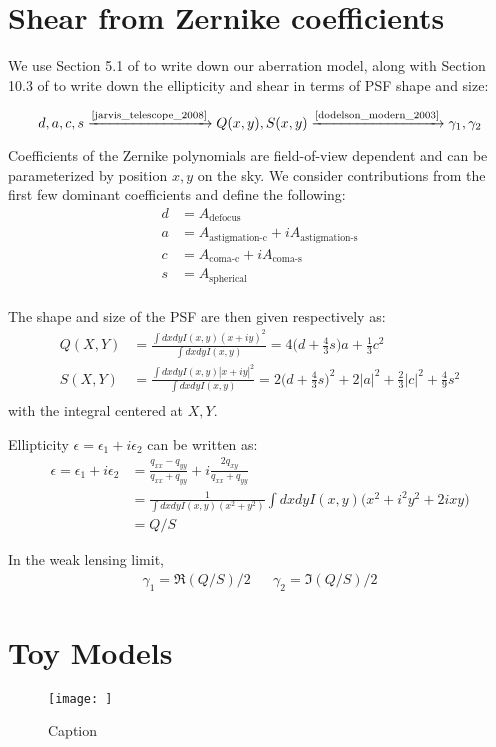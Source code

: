 \section{Shear from Zernike coefficients} \label{sec:ell_zernike} 

We use Section 5.1 of \cite{jarvis_telescope_2008} to write down our aberration model, along with Section 10.3 of \cite{dodelson_modern_2003} to write down the ellipticity and shear in terms of PSF shape and size: 

\begin{equation}
d, a, c, s \xrightarrow{\text{\cite{jarvis_telescope_2008}}} Q(x, y), S(x, y) \xrightarrow{\text{\cite{dodelson_modern_2003}}} \gamma_1, \gamma_2
\end{equation}

Coefficients of the Zernike polynomials are field-of-view dependent and can be parameterized by position $x, y$ on the sky. We consider contributions from the first few dominant coefficients and define the following:
\begin{align}
d &= A_\text{defocus} \\
a &= A_\text{astigmation-c} + i A_\text{astigmation-s} \\
c &= A_\text{coma-c} + i A_\text{coma-s} \\
s &= A_\text{spherical} \\
\end{align}

The shape and size of the PSF are then given respectively as:
\begin{align}
Q(X, Y) &= \frac{\int dx dy I(x, y) (x+iy)^2}{\int dx dy I(x, y)} = 4 \Big(d+\frac{4}{3}s \Big) a + \frac{1}{3} c^2\\
S(X, Y) &= \frac{\int dx dy I(x, y) |x+iy|^2}{\int dx dy I(x, y)} = 2 \Big(d+\frac{4}{3}s \Big)^2 + 2 |a|^2 + \frac{2}{3} |c|^2 + \frac{4}{9} s^2\\
\end{align}
with the integral centered at $X, Y$. 

Ellipticity $\epsilon = \epsilon_1 + i \epsilon_2$ can be written as:
\begin{align}
\epsilon = \epsilon_1 + i \epsilon_2 &= \frac{q_{xx} - q_{yy}}{q_{xx} + q_{yy}} + i \frac{2 q_{xy}}{q_{xx} + q_{yy}}\\
&= \frac{1}{\int dx dy I(x, y) (x^2 + y^2)} \int dx dy I(x, y) \Big( x^2 + i^2 y^2 + 2ixy \Big) \\
&= Q \Big/ S
\end{align}

In the weak lensing limit, 
\begin{align}
\gamma_1 = \Re(Q / S) \Big/ 2 && \gamma_2 = \Im(Q / S) \Big/ 2
\end{align}

\section{Toy Models} \label{sec:toy_models}

\begin{figure}[h]
\centering
\texttt{[image: ]}
\caption{Caption}
\label{fig:my_label}
\end{figure}
